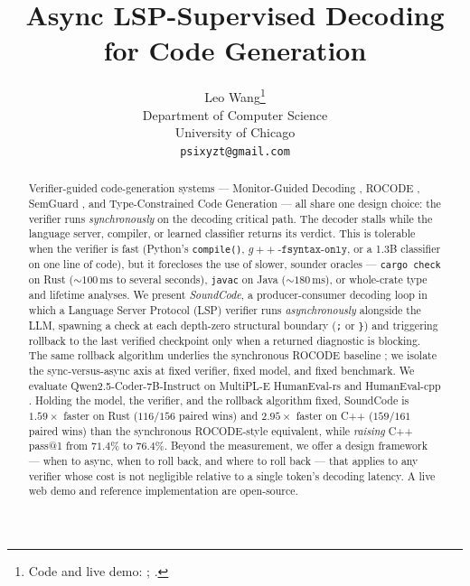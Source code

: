 \documentclass{article}
\title{Async LSP-Supervised Decoding for Code Generation}
\author{%
  Leo Wang\thanks{Code and live demo:
    \href{https://github.com/leobwang/soundcode}{\code{github.com/leobwang/soundcode}};
    \href{https://soundcode-demo.psixyzt.com}{\code{soundcode-demo.psixyzt.com}}.}\\
  Department of Computer Science\\
  University of Chicago\\
  \texttt{psixyzt@gmail.com}\\
}
\newcommand{\code}[1]{\texttt{#1}}
\begin{document}
\maketitle

\begin{abstract}
Verifier-guided code-generation systems --- Monitor-Guided Decoding
\citep{agrawal2023monitor}, ROCODE \citep{jiang2024rocode}, SemGuard
\citep{wang2025semguard}, and Type-Constrained Code Generation
\citep{mundler2025typeconstrained} --- all share one design choice:
the verifier runs \emph{synchronously} on the decoding critical path.
The decoder stalls while the language server, compiler, or learned
classifier returns its verdict. This is tolerable when the verifier
is fast (Python's \code{compile()}, $g{+}{+}\;\code{-fsyntax-only}$,
or a 1.3B classifier on one line of code), but it forecloses the
use of slower, sounder oracles --- \code{cargo check} on Rust
(${\sim}100\,\mathrm{ms}$ to several seconds), \code{javac} on Java
(${\sim}180\,\mathrm{ms}$), or whole-crate type and lifetime analyses.
We present \emph{SoundCode}, a producer-consumer decoding loop in
which a Language Server Protocol (LSP)
\citep{agrawal2023monitor,multilspy} verifier runs
\emph{asynchronously} alongside the LLM, spawning a check at each
depth-zero structural boundary (\code{;} or \code{\}}) and triggering
rollback to the last verified checkpoint only when a returned
diagnostic is blocking. The same rollback algorithm underlies the
synchronous ROCODE baseline \citep{jiang2024rocode}; we isolate the
sync-versus-async axis at fixed verifier, fixed model, and fixed
benchmark.
We evaluate Qwen2.5-Coder-7B-Instruct \citep{hui2024qwen25coder}
on MultiPL-E HumanEval-rs and HumanEval-cpp
\citep{cassano2022multipl}. Holding the model, the verifier, and the
rollback algorithm fixed, SoundCode is $1.59\times$ faster on Rust
($116/156$ paired wins) and $2.95\times$ faster on C++
($159/161$ paired wins) than the synchronous ROCODE-style
equivalent, while \emph{raising} C++ pass@1 from $71.4\%$ to $76.4\%$.
Beyond the measurement, we offer a design framework
--- when to async, when to roll back, and where to roll back --- that
applies to any verifier whose cost is not negligible relative to a
single token's decoding latency. A live web demo and reference
implementation are open-source.
\end{abstract}









\end{document}
